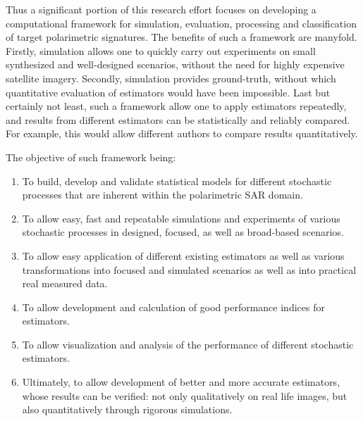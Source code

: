 Thus a significant portion of this research effort focuses on developing a computational framework for simulation, evaluation, processing and classification of target polarimetric signatures.
The benefits of such a framework are manyfold.
Firstly, simulation allows one to quickly carry out experiments on small synthesized and well-designed scenarios, without the need for highly expensive satellite imagery.
Secondly, simulation provides ground-truth, without which quantitative evaluation of estimators would have been impossible.
Last but certainly not least, such a framework allow one to apply estimators repeatedly, and results from different estimators can be statistically and reliably compared. For example, this would allow different authors to compare results quantitatively.

The objective of such framework being:
\begin{enumerate}
\item To build, develop and validate statistical models for different stochastic processes that are inherent within the polarimetric SAR domain.
\item To allow easy, fast and repeatable simulations and experiments of various stochastic processes in designed, focused, as well as broad-based scenarios.
\item To allow easy application of different existing estimators as well as various transformations into focused and simulated scenarios as well as into practical real measured data.
\item To allow development and calculation of good performance indices for estimators. 
\item To allow visualization and analysis of the performance of different stochastic estimators.
\item Ultimately, to allow development of better and more accurate estimators, whose results can be verified: not only qualitatively on real life images, but also quantitatively through rigorous simulations.
\end{enumerate}

